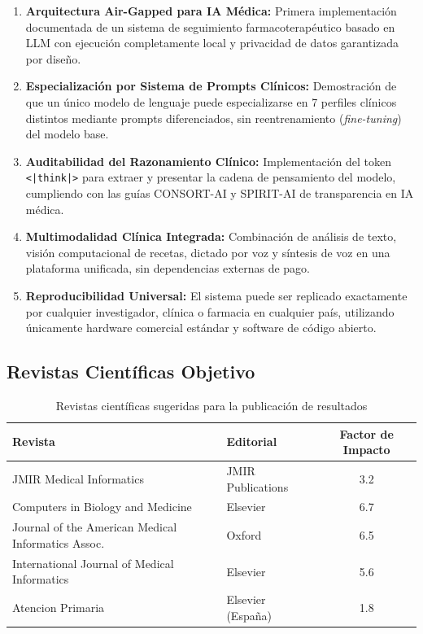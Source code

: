 \documentclass[12pt,a4paper]{article}
\begin{document}
\begin{enumerate}[label=\textbf{\Roman*.}]
  \item \textbf{Arquitectura Air-Gapped para IA Médica:} Primera implementación documentada de
    un sistema de seguimiento farmacoterapéutico basado en LLM con ejecución completamente local
    y privacidad de datos garantizada por diseño.

  \item \textbf{Especialización por Sistema de Prompts Clínicos:} Demostración de que un único
    modelo de lenguaje puede especializarse en 7 perfiles clínicos distintos mediante prompts
    diferenciados, sin reentrenamiento (\textit{fine-tuning}) del modelo base.

  \item \textbf{Auditabilidad del Razonamiento Clínico:} Implementación del token
    \texttt{<|think|>} para extraer y presentar la cadena de pensamiento del modelo, cumpliendo
    con las guías CONSORT-AI y SPIRIT-AI de transparencia en IA médica.

  \item \textbf{Multimodalidad Clínica Integrada:} Combinación de análisis de texto, visión
    computacional de recetas, dictado por voz y síntesis de voz en una plataforma unificada,
    sin dependencias externas de pago.

  \item \textbf{Reproducibilidad Universal:} El sistema puede ser replicado exactamente por
    cualquier investigador, clínica o farmacia en cualquier país, utilizando únicamente hardware
    comercial estándar y software de código abierto.
\end{enumerate}

\subsection{Revistas Científicas Objetivo}

\begin{table}[H]
  \centering
  \caption{Revistas científicas sugeridas para la publicación de resultados}
  \begin{tabular}{llc}
    \toprule
    \textbf{Revista} & \textbf{Editorial} & \textbf{Factor de Impacto} \\
    \midrule
    JMIR Medical Informatics & JMIR Publications & 3.2 \\
    Computers in Biology and Medicine & Elsevier & 6.7 \\
    Journal of the American Medical Informatics Assoc. & Oxford & 6.5 \\
    International Journal of Medical Informatics & Elsevier & 5.6 \\
    Atencion Primaria & Elsevier (España) & 1.8 \\
    \bottomrule
  \end{tabular}
\end{table}
\end{document}
